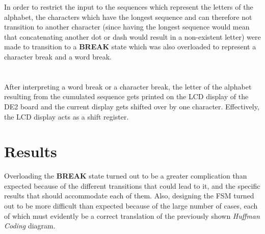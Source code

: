 \documentclass[12pt, letterpaper, english]{article}
\begin{document}
\indent In order to restrict the input to the sequences which represent the letters of the alphabet, the characters which have the longest sequence and can therefore not transition to another character (since having the longest sequence would mean that concatenating another dot or dash would result in a non-existent letter) were made to transition to a \textbf{BREAK} state which was also overloaded to represent a character break and a word break.\\ 

\\\\
\indent After interpreting a word break or a character break, the letter of the alphabet resulting from the cumulated sequence gets printed on the LCD display of the DE2 board and the current display gets shifted over by one character. Effectively, the LCD display acts as a shift register.
\section*{Results}
\indent\indent Overloading the \textbf{BREAK} state turned out to be a greater complication than expected because of the different transitions that could lead to it, and the specific results that should accommodate each of them. Also, designing the FSM turned out to be more difficult than expected because of the large number of cases, each of which must evidently be a correct translation of the previously shown \textit{Huffman Coding} diagram.
\end{document}

